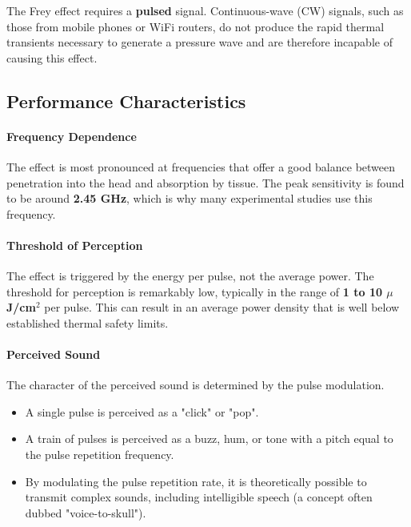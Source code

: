 \begin{warningbox}
    The Frey effect requires a \textbf{pulsed} signal. Continuous-wave (CW) signals, such as those from mobile phones or WiFi routers, do not produce the rapid thermal transients necessary to generate a pressure wave and are therefore incapable of causing this effect.
\end{warningbox}


\subsection{Performance Characteristics}

\paragraph{Frequency Dependence}
The effect is most pronounced at frequencies that offer a good balance between penetration into the head and absorption by tissue. The peak sensitivity is found to be around \textbf{2.45 GHz}, which is why many experimental studies use this frequency.

\paragraph{Threshold of Perception}
The effect is triggered by the energy per pulse, not the average power. The threshold for perception is remarkably low, typically in the range of \textbf{1 to 10 $\mu$J/cm$^2$} per pulse. This can result in an average power density that is well below established thermal safety limits.

\paragraph{Perceived Sound}
The character of the perceived sound is determined by the pulse modulation.
\begin{itemize}
    \item A single pulse is perceived as a "click" or "pop".
    \item A train of pulses is perceived as a buzz, hum, or tone with a pitch equal to the pulse repetition frequency.
    \item By modulating the pulse repetition rate, it is theoretically possible to transmit complex sounds, including intelligible speech (a concept often dubbed "voice-to-skull").
\end{itemize}


